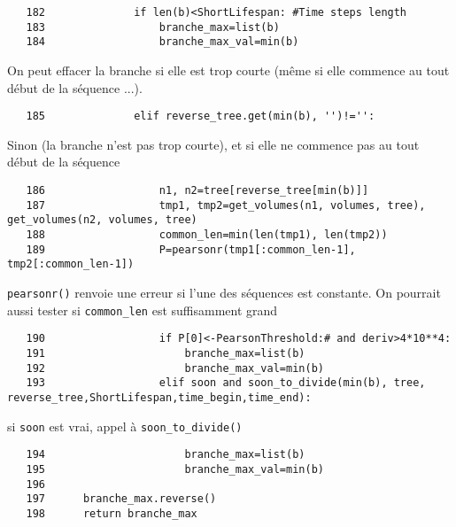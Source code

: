 \documentclass{article}
\def \mycolor {red}
\begin{document}
\color{black}
\begin{verbatim}
   182	            if len(b)<ShortLifespan: #Time steps length 
   183	                branche_max=list(b)
   184	                branche_max_val=min(b)
\end{verbatim} 
\color{\mycolor}
On peut effacer la branche si elle est trop courte (m\^eme si elle commence au tout d\'ebut de la s\'equence ...).
\color{black}
\begin{verbatim}
   185	            elif reverse_tree.get(min(b), '')!='':
\end{verbatim} 
\color{\mycolor}
Sinon (la branche n'est pas trop courte), et si elle ne commence pas au tout d\'ebut de la s\'equence
\color{black}
\begin{verbatim}
   186	                n1, n2=tree[reverse_tree[min(b)]]
   187	                tmp1, tmp2=get_volumes(n1, volumes, tree), get_volumes(n2, volumes, tree)
   188	                common_len=min(len(tmp1), len(tmp2))
   189	                P=pearsonr(tmp1[:common_len-1], tmp2[:common_len-1])
\end{verbatim} 
\color{\mycolor}
\verb|pearsonr()| renvoie une erreur si l'une des s\'equences est constante. On pourrait aussi tester si \verb|common_len| est suffisamment grand
\color{black}
\begin{verbatim}
   190	                if P[0]<-PearsonThreshold:# and deriv>4*10**4:
   191	                    branche_max=list(b)
   192	                    branche_max_val=min(b)
   193	                elif soon and soon_to_divide(min(b), tree, reverse_tree,ShortLifespan,time_begin,time_end):
\end{verbatim} 
\color{\mycolor}
si \verb|soon| est vrai, appel \`a \verb|soon_to_divide()|
\color{black}
\begin{verbatim}
   194	                    branche_max=list(b)
   195	                    branche_max_val=min(b)
   196	
   197	    branche_max.reverse()
   198	    return branche_max
\end{verbatim}
\end{document}
